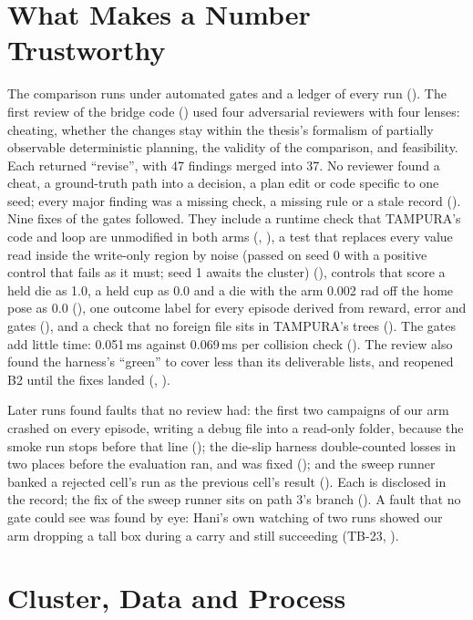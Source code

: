 \section{What Makes a Number Trustworthy}
\label{sec:trust}

The comparison runs under automated gates and a ledger of every run
(). The first review of the bridge code () used four
adversarial reviewers with four lenses: cheating, whether the changes stay within the
thesis's formalism of partially observable deterministic planning, the validity of the
comparison, and feasibility. Each returned ``revise'', with 47 findings merged into
37. No reviewer found a cheat, a ground-truth path into a decision, a plan edit or
code specific to one seed; every major finding was a missing check, a missing rule
or a stale record (). Nine fixes of the gates followed. They include a
runtime check that TAMPURA's code and loop are unmodified in both arms (,
), a test that replaces every value read inside the write-only region by
noise (passed on seed 0 with a positive control that fails as it must; seed 1 awaits
the cluster) (), controls that score a held die as 1.0, a held cup as 0.0 and
a die with the arm 0.002 rad off the home pose as 0.0 (), one outcome label for
every episode derived from reward, error and gates (), and a check that no
foreign file sits in TAMPURA's trees (). The gates add little time: 0.051\,ms
against 0.069\,ms per collision check (). The review also found the harness's
``green'' to cover less than its deliverable lists, and reopened B2 until the fixes
landed (, ).

Later runs found faults that no review had: the first two campaigns of our arm
crashed on every episode, writing a debug file into a read-only folder, because the
smoke run stops before that line (); the die-slip harness double-counted losses in
two places before the evaluation ran, and was fixed (); and the sweep runner banked a
rejected cell's run as the previous cell's result (). Each is disclosed in
the record; the fix of the sweep runner sits on path 3's branch (). A fault that
no gate could see was found by eye: Hani's own watching of two runs showed our arm
dropping a tall box during a carry and still succeeding (TB-23, ).

\section{Cluster, Data and Process}
\label{sec:process}

